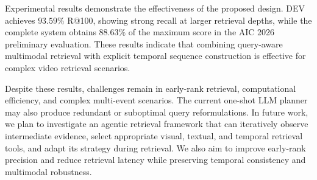 \documentclass[runningheads]{llncs}
\begin{document}
Experimental results demonstrate the effectiveness of the proposed design. DEV achieves $93.59\%$ R@100, showing strong recall at larger retrieval depths, while the complete system obtains $88.63\%$ of the maximum score in the AIC 2026 preliminary evaluation. These results indicate that combining query-aware multimodal retrieval with explicit temporal sequence construction is effective for complex video retrieval scenarios.

Despite these results, challenges remain in early-rank retrieval, computational efficiency, and complex multi-event scenarios. The current one-shot LLM planner may also produce redundant or suboptimal query reformulations. In future work, we plan to investigate an agentic retrieval framework that can iteratively observe intermediate evidence, select appropriate visual, textual, and temporal retrieval tools, and adapt its strategy during retrieval. We also aim to improve early-rank precision and reduce retrieval latency while preserving temporal consistency and multimodal robustness.






\end{document}
